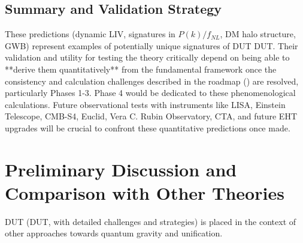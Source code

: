\documentclass[11pt, a4paper]{article}
\theoremstyle{remark}
\begin{document}
\subsection{Summary and Validation Strategy}
\label{subsec:summary_validation_predictions_revised}
These predictions (dynamic LIV, signatures in \(P(k)/f_{NL}\), DM halo structure, GWB) represent examples of potentially unique signatures of DUT DUT. Their validation and utility for testing the theory critically depend on being able to **derive them quantitatively** from the fundamental framework once the consistency and calculation challenges described in the roadmap () are resolved, particularly Phases 1-3. Phase 4 would be dedicated to these phenomenological calculations.
Future observational tests with instruments like LISA, Einstein Telescope, CMB-S4, Euclid, Vera C. Rubin Observatory, CTA, and future EHT upgrades will be crucial to confront these quantitative predictions once made.

\section{Preliminary Discussion and Comparison with Other Theories}
\label{sec:comparison_final}

DUT (DUT, with detailed challenges and strategies) is placed in the context of other approaches towards quantum gravity and unification.
\end{document}
